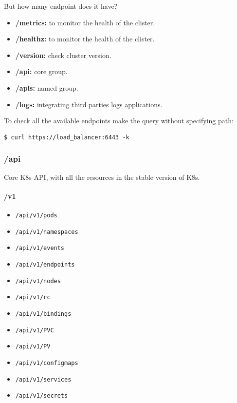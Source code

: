 \documentclass{article}
\newenvironment{codetemplate}[1][]{%
  \mybasecolorbox[#1]
  \itshape
}{%
  \endmybasecolorbox
}
\begin{document}
But how many endpoint does it have?
\begin{itemize}
    \item \textbf{/metrics:} to monitor the health of the clister.
    \item \textbf{/healthz:} to monitor the health of the clister.
    \item \textbf{/version:} check cluster version.
    \item \textbf{/api:} core group.
    \item \textbf{/apis:} named group.
    \item \textbf{/logs:} integrating third parties logs applications.
\end{itemize}

To check all the available endpoints make the query without specifying path:
\begin{codetemplate}{}
\begin{verbatim}
$ curl https://load_balancer:6443 -k
\end{verbatim}
\end{codetemplate}

\subsubsection{/api}
Core K8s API, with all the resources in the stable version of K8s.

\paragraph{/v1}
\begin{itemize}
    \item \verb|/api/v1/pods|
    \item \verb|/api/v1/namespaces|
    \item \verb|/api/v1/events|
    \item \verb|/api/v1/endpoints|
    \item \verb|/api/v1/nodes|
    \item \verb|/api/v1/rc|
    \item \verb|/api/v1/bindings|
    \item \verb|/api/v1/PVC|
    \item \verb|/api/v1/PV|
    \item \verb|/api/v1/configmaps|
    \item \verb|/api/v1/services|
    \item \verb|/api/v1/secrets|
\end{itemize}
\end{document}
